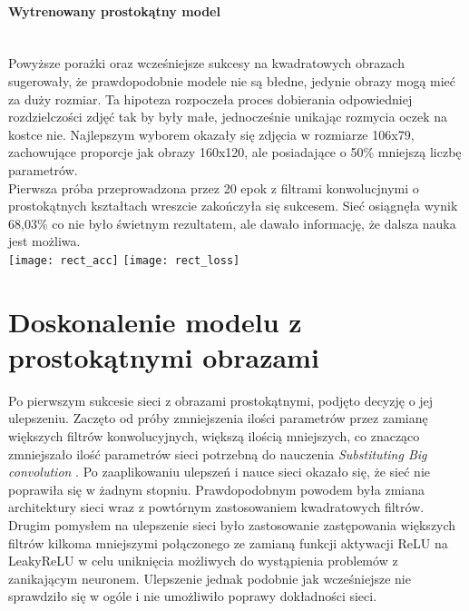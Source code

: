 \paragraph{Wytrenowany prostokątny model} \mbox{}\\
Powyższe porażki oraz wcześniejsze sukcesy na kwadratowych obrazach sugerowały, że
prawdopodobnie modele nie są błedne, jedynie obrazy mogą mieć za duży rozmiar. Ta hipoteza
rozpoczeła proces dobierania odpowiedniej rozdzielczości zdjęć tak by były małe, jednocześnie
unikając rozmycia oczek na kostce nie. Najlepszym wyborem okazały się zdjęcia w rozmiarze 106x79,
zachowujące proporcje jak obrazy 160x120, ale posiadające o 50\% mniejszą liczbę parametrów.\\
Pierwsza próba przeprowadzona przez 20 epok z filtrami konwolucjnymi o prostokątnych
kształtach wreszcie zakończyła się sukcesem. Sieć osiągnęła wynik 68,03\% co nie
było świetnym rezultatem, ale dawało informację, że dalsza nauka jest możliwa.\\
\texttt{[image: rect\_acc]}
\texttt{[image: rect\_loss]}

\section{Doskonalenie modelu z prostokątnymi obrazami}
Po pierwszym sukcesie sieci z obrazami prostokątnymi, podjęto decyzję o jej ulepszeniu.
Zaczęto od próby zmniejszenia ilości parametrów przez zamianę większych filtrów konwolucyjnych,
większą ilością mniejszych, co znacząco zmniejszało ilość parametrów sieci potrzebną do nauczenia
\textit{Substituting Big convolution} \cite{substBigConv}.
Po zaaplikowaniu ulepszeń i nauce sieci okazało się, że sieć nie poprawiła się w żadnym
stopniu. Prawdopodobnym powodem była zmiana architektury sieci wraz z powtórnym
zastosowaniem kwadratowych filtrów.\\
Drugim pomysłem na ulepszenie sieci było zastosowanie zastępowania większych filtrów
kilkoma mniejszymi połączonego ze zamianą funkcji aktywacji ReLU na LeakyReLU w celu uniknięcia
możliwych do wystąpienia problemów z zanikającym neuronem. Ulepszenie jednak podobnie
jak wcześniejsze nie sprawdziło się w ogóle i nie umożliwiło poprawy dokładności sieci.


